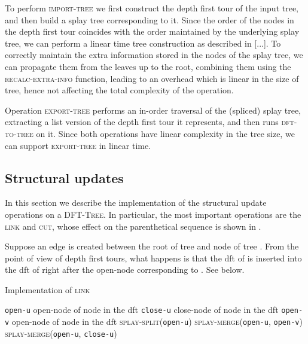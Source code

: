 \documentclass[a4paper,USenglish]{lipics}
\newcommand{\var}[1]{\textrm{\texttt{#1}}}
\newcommand{\dft}{\textsc{DFT-Tree}}
\begin{document}
		To perform \textsc{import-tree} we first construct the depth first tour of the input tree, and then build a splay tree corresponding to it. Since the order of the nodes in the depth first tour coincides with the order maintained by the underlying splay tree, we can perform a linear time tree construction as described in [...]. To correctly maintain the extra information stored in the nodes of the splay tree, we can propagate them from the leaves up to the root, combining them using the \textsc{recalc-extra-info} function, leading to an overhead which is linear in the size of tree, hence not affecting the total complexity of the operation.
		
		Operation \textsc{export-tree} performs an in-order traversal of the (spliced) splay tree, extracting a list version of the depth first tour it represents, and then runs \textsc{dft-to-tree} on it. Since both operations have linear complexity in the tree size, we can support \textsc{export-tree} in linear time.
		
		\subsection{Structural updates}
		
In this section we describe the implementation of the structural update operations on a \dft. In particular, the most important operations are the \textsc{link} and \textsc{cut}, whose effect on the parenthetical sequence is shown in .

Suppose an edge is created between the root  of tree  and node  of tree . From the point of view of depth first tours, what happens is that the dft of  is inserted into the dft of  right after the open-node corresponding to . See  below.

		\begin{algorithm}[H]
		  \small
		  \caption{\small Implementation of \textsc{link} \label{alg:link}}
		  \begin{algorithmic}[1]
			    \State \var{open-u}  open-node of node  in the dft
			   	\State \var{close-u}  close-node of node  in the dft
			   	\State \var{open-v}  open-node of node  in the dft
		    	\State \textsc{splay-split}(\var{open-u})
		    	\State \textsc{splay-merge}(\var{open-u}, \var{open-v})
		    	\State \textsc{splay-merge}(\var{open-u}, \var{close-u})
		    \EndIf
		    \EndProcedure
		  \end{algorithmic}
		\end{algorithm}	
		
\end{document}
